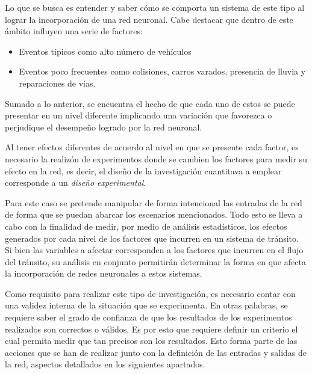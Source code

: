 	Lo que se busca es entender y saber c\'{o}mo se comporta un sistema de este
tipo al lograr la incorporaci\'{o}n de una red neuronal. Cabe destacar que
dentro de este \'{a}mbito influyen una serie de factores:

\begin{itemize}
  \item Eventos t\'{i}picos como alto n\'{u}mero de veh\'{i}culos
  \item Eventos poco frecuentes como colisiones, carros varados, presencia de
  lluvia y reparaciones de v\'{i}as.
\end{itemize} 

	Sumado a lo anterior, se encuentra el hecho de que cada uno de estos se puede
	presentar en un nivel diferente implicando una variaci\'{o}n que favorezca o
	perjudique el desempe\~{n}o logrado por la red neuronal.
	
	 Al tener efectos diferentes de acuerdo al nivel en que se presente cada
factor, es necesario la realiz\'{o}n de experimentos donde se cambien los
 factores para medir su efecto en la red,
 es decir, el dise\~{n}o de la investigaci\'{o}n cuantitava a emplear
 corresponde a un \textit{dise\~{n}o experimental}.
 
 	Para este caso se pretende manipular de forma intencional las entradas de la
 red de forma que se puedan abarcar los escenarios mencionados. Todo esto se
 lleva a cabo con la finalidad de medir, por medio de an\'{a}lisis
 estad\'{i}sticos, los efectos generados por cada nivel de los factores que
 incurren en un sistema de tr\'{a}nsito. Si bien las variables a afectar
 corresponden a los factores que incurren en el flujo del tr\'{a}nsito, su
 an\'{a}lisis en conjunto permitir\'{a}n determinar la forma en que afecta la
 incorporaci\'{o}n de redes neuronales a estos sistemas.
 
  	Como requisito para realizar este tipo de investigaci\'{o}n, es necesario
contar con una validez interna de la situaci\'{o}n que se experimenta. En
otras palabras, se requiere saber el grado de confianza de que los resultados
de los experimentos realizados son correctos o v\'{a}lidos. Es por esto que
requiere definir un criterio el cual permita medir que tan precisos son los
resultados. Esto forma parte de las acciones que se han de realizar junto
con la definici\'{o}n de las entradas y salidas de la red, aspectos detallados
en los siguientes apartados.


 
	
	
	
	
